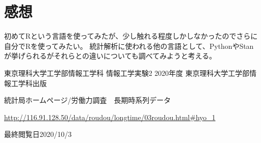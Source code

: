 \documentclass[12pt]{jarticle}
\begin{document}
\clearpage
\section{感想}
初めてRという言語を使ってみたが、少し触れる程度しかしなかったのでさらに自分でRを使ってみたい。
統計解析に使われる他の言語として、PythonやStanが挙げられるがそれらとの違いについても調べてみようと考える。

\begin{thebibliography}{99}
    \label{sannkoubunnkenn_chapter}
    東京理科大学工学部情報工学科 情報工学実験2 2020年度
    東京理科大学工学部情報工学科出版

    統計局ホームページ/労働力調査　長期時系列データ

    \url{http://116.91.128.50/data/roudou/longtime/03roudou.html#hyo_1}

    最終閲覧日2020/10/3
\end{thebibliography}

\clearpage

\appendix
\end{document}
